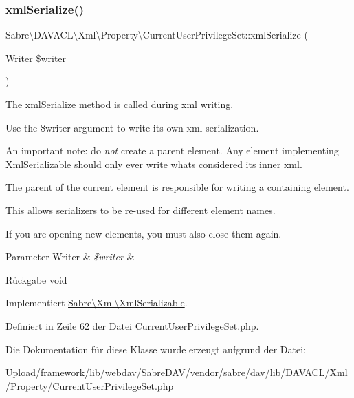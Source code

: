 \subsubsection{\texorpdfstring{xml\+Serialize()}{xmlSerialize()}}
{\footnotesize\ttfamily Sabre\textbackslash{}\+D\+A\+V\+A\+C\+L\textbackslash{}\+Xml\textbackslash{}\+Property\textbackslash{}\+Current\+User\+Privilege\+Set\+::xml\+Serialize (\begin{DoxyParamCaption}\item[{\mbox{\hyperlink{class_sabre_1_1_xml_1_1_writer}{Writer}}}]{\$writer }\end{DoxyParamCaption})}

The xml\+Serialize method is called during xml writing.

Use the \$writer argument to write its own xml serialization.

An important note\+: do {\itshape not} create a parent element. Any element implementing Xml\+Serializable should only ever write what\textquotesingle{}s considered its \textquotesingle{}inner xml\textquotesingle{}.

The parent of the current element is responsible for writing a containing element.

This allows serializers to be re-\/used for different element names.

If you are opening new elements, you must also close them again.


\begin{DoxyParams}[1]{Parameter}
Writer & {\em \$writer} & \\
\hline
\end{DoxyParams}
\begin{DoxyReturn}{Rückgabe}
void 
\end{DoxyReturn}


Implementiert \mbox{\hyperlink{interface_sabre_1_1_xml_1_1_xml_serializable_aa78f3ee43aa699be8347181653a53d8c}{Sabre\textbackslash{}\+Xml\textbackslash{}\+Xml\+Serializable}}.



Definiert in Zeile 62 der Datei Current\+User\+Privilege\+Set.\+php.



Die Dokumentation für diese Klasse wurde erzeugt aufgrund der Datei\+:\begin{DoxyCompactItemize}
\item 
Upload/framework/lib/webdav/\+Sabre\+D\+A\+V/vendor/sabre/dav/lib/\+D\+A\+V\+A\+C\+L/\+Xml/\+Property/Current\+User\+Privilege\+Set.\+php\end{DoxyCompactItemize}
